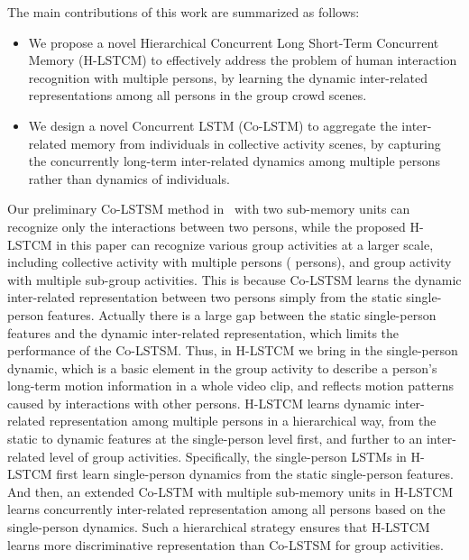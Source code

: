 \documentclass[9pt,journal,letterpaper,twocolumn]{IEEEtran}
\begin{document}
	
	The main contributions of this work are summarized as follows:
	\begin{itemize}
		\item We propose a novel Hierarchical Concurrent Long Short-Term Concurrent Memory (H-LSTCM) to effectively address the problem of human interaction recognition with multiple persons, by learning the dynamic inter-related representations among all persons in the group crowd scenes.
		\item We design a novel Concurrent LSTM (Co-LSTM) to aggregate the inter-related memory from individuals in collective activity scenes, by capturing the concurrently long-term inter-related dynamics among multiple persons rather than dynamics of individuals.
	\end{itemize}
	
	{




		
		Our preliminary Co-LSTSM method in~\cite{shu2017concurrence} with two sub-memory units can recognize only the interactions between two persons, while the proposed H-LSTCM in this paper can recognize various group activities at a larger scale, including collective activity with multiple persons ( persons), and group activity with multiple sub-group activities. This is because Co-LSTSM learns the dynamic inter-related representation between two persons simply from the static single-person features. Actually there is a large gap between the static single-person features and the dynamic inter-related representation, which limits the performance of the Co-LSTSM. Thus, in H-LSTCM we bring in the single-person dynamic, which is a basic element in the group activity to describe a person's long-term motion information in a whole video clip, and reflects motion patterns caused by interactions with other persons. H-LSTCM learns dynamic inter-related representation among multiple persons in a hierarchical way, from the static to dynamic features at the single-person level first, and further to an inter-related level of group activities. Specifically, the single-person LSTMs in H-LSTCM first learn single-person dynamics from the static single-person features. And then, an extended Co-LSTM with multiple sub-memory units in H-LSTCM learns concurrently inter-related representation among all persons based on the single-person dynamics. Such a hierarchical strategy ensures that H-LSTCM learns more discriminative representation than Co-LSTSM for group activities. 
		
		
		
}
	
\end{document}
